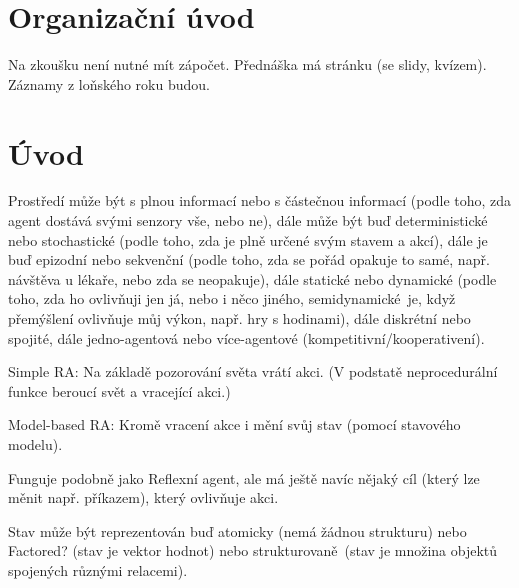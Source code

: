 \documentclass[12pt]{article}					%
\begin{document}

\section*{Organizační úvod}
\begin{poznamka}
	Na zkoušku není nutné mít zápočet. Přednáška má stránku (se slidy, kvízem). Záznamy z loňského roku budou.
\end{poznamka}

\section{Úvod}


\begin{definice}[Prostředí]
	Prostředí může být s plnou informací nebo s částečnou informací (podle toho, zda agent dostává svými senzory vše, nebo ne), dále může být buď deterministické nebo stochastické (podle toho, zda je plně určené svým stavem a akcí), dále je buď epizodní nebo sekvenční (podle toho, zda se pořád opakuje to samé, např. návštěva u lékaře, nebo zda se neopakuje), dále statické nebo dynamické (podle toho, zda ho ovlivňuji jen já, nebo i něco jiného, semidynamické je, když přemýšlení ovlivňuje můj výkon, např. hry s hodinami), dále diskrétní nebo spojité, dále jedno-agentová nebo více-agentové (kompetitivní/kooperativení).
\end{definice}

\begin{definice}
	Simple RA: Na základě pozorování světa vrátí akci. (V podstatě neprocedurální funkce beroucí svět a vracející akci.)

	Model-based RA: Kromě vracení akce i mění svůj stav (pomocí stavového modelu).
\end{definice}

\begin{definice}
	Funguje podobně jako Reflexní agent, ale má ještě navíc nějaký cíl (který lze měnit např. příkazem), který ovlivňuje akci.
\end{definice}

\begin{definice}[Stav]
	Stav může být reprezentován buď atomicky (nemá žádnou strukturu) nebo Factored? (stav je vektor hodnot) nebo strukturovaně (stav je množina objektů spojených různými relacemi).
\end{definice}
\end{document}
